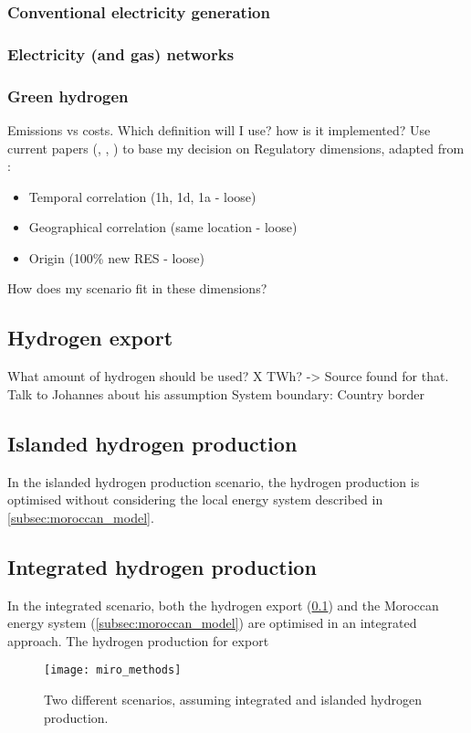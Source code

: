 \subsubsection{Conventional electricity generation}


\subsubsection{Electricity (and gas) networks}


\subsubsection{Green hydrogen}
Emissions vs costs. Which definition will I use? how is it implemented?
Use current papers (\cite{Brauer2022}, \cite{Ruhnau2022}, \cite{Zeyen2022a}) to base my decision on
Regulatory dimensions, adapted from \cite{Brauer2022}:
\begin{itemize}
    \item Temporal correlation (1h, 1d, 1a - loose) 
    \item Geographical correlation (same location - loose)
    \item Origin (100\% new RES - loose)
\end{itemize}
How does my scenario fit in these dimensions?



\subsection{Hydrogen export}
\label{subsec:hydrogen_export}
What amount of hydrogen should be used? X TWh? -> Source found for that. Talk to Johannes about his assumption
System boundary: Country border



\subsection{Islanded hydrogen production}
In the islanded hydrogen production scenario, the hydrogen production is optimised without considering the local energy system described in \ref{subsec:moroccan_model}.


\subsection{Integrated hydrogen production}
In the integrated scenario, both the hydrogen export (\ref{subsec:hydrogen_export}) and the Moroccan energy system (\ref{subsec:moroccan_model})
are optimised in an integrated approach.
The hydrogen production for export


\begin{figure}[h!]
    \centering
    \texttt{[image: miro\_methods]}
    \caption{Two different scenarios, assuming integrated and islanded hydrogen production.}
    \label{fig:methods_scenarios}
\end{figure}


